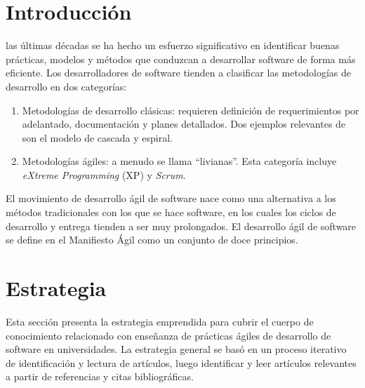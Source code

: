 \documentclass[journal]{IEEEtran}
\begin{document}
\section{Introducción}
% 
% 
% 
% 
 las últimas décadas se ha hecho un esfuerzo significativo en identificar buenas prácticas, modelos y métodos que conduzcan a desarrollar software de forma más eficiente. Los desarrolladores de software tienden a clasificar las metodologías de desarrollo en dos categorías\cite{li-jian-armin-eberlein}:
\begin{enumerate}
    \item Metodologías de desarrollo clásicas: requieren definición de requerimientos por adelantado, documentación y planes detallados. Dos ejemplos relevantes de son el modelo de cascada y espiral.
    \item Metodologías ágiles: a menudo se llama ``livianas''. Esta categoría incluye \emph{eXtreme Programming} (XP) y \emph{Scrum}.
\end{enumerate}

El movimiento de desarrollo ágil de software nace como una alternativa a los métodos tradicionales con los que se hace software, en los cuales los ciclos de desarrollo y entrega tienden a ser muy  prolongados. El desarrollo ágil de software se define en el Manifiesto Ágil \cite{agile-manifesto} como un conjunto de doce principios.


\section{Estrategia}
Esta sección presenta la estrategia emprendida para cubrir el cuerpo de conocimiento relacionado con enseñanza de prácticas ágiles de desarrollo de software en universidades. La estrategia general se basó en un proceso iterativo de identificación y lectura de artículos, luego identificar y leer artículos relevantes a partir de referencias y citas bibliográficas.
\end{document}
